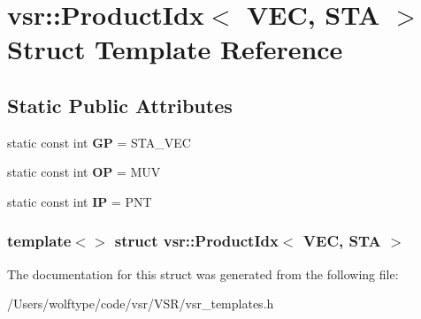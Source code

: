 \hypertarget{structvsr_1_1_product_idx_3_01_v_e_c_00_01_s_t_a_01_4}{\section{vsr\-:\-:Product\-Idx$<$ V\-E\-C, S\-T\-A $>$ Struct Template Reference}
\label{structvsr_1_1_product_idx_3_01_v_e_c_00_01_s_t_a_01_4}
}
\subsection*{Static Public Attributes}
\begin{DoxyCompactItemize}
\item 
\hypertarget{structvsr_1_1_product_idx_3_01_v_e_c_00_01_s_t_a_01_4_a618c9ff5d862f3a230141b573545a215}{static const int {\bfseries G\-P} = S\-T\-A\-\_\-\-V\-E\-C}\label{structvsr_1_1_product_idx_3_01_v_e_c_00_01_s_t_a_01_4_a618c9ff5d862f3a230141b573545a215}

\item 
\hypertarget{structvsr_1_1_product_idx_3_01_v_e_c_00_01_s_t_a_01_4_a9d3290965487a1a064ac847300897c74}{static const int {\bfseries O\-P} = M\-U\-V}\label{structvsr_1_1_product_idx_3_01_v_e_c_00_01_s_t_a_01_4_a9d3290965487a1a064ac847300897c74}

\item 
\hypertarget{structvsr_1_1_product_idx_3_01_v_e_c_00_01_s_t_a_01_4_a165606ad5843a49d915cb2489703ed6e}{static const int {\bfseries I\-P} = P\-N\-T}\label{structvsr_1_1_product_idx_3_01_v_e_c_00_01_s_t_a_01_4_a165606ad5843a49d915cb2489703ed6e}

\end{DoxyCompactItemize}
\subsubsection*{template$<$$>$ struct vsr\-::\-Product\-Idx$<$ V\-E\-C, S\-T\-A $>$}



The documentation for this struct was generated from the following file\-:\begin{DoxyCompactItemize}
\item 
/\-Users/wolftype/code/vsr/\-V\-S\-R/vsr\-\_\-templates.\-h\end{DoxyCompactItemize}
